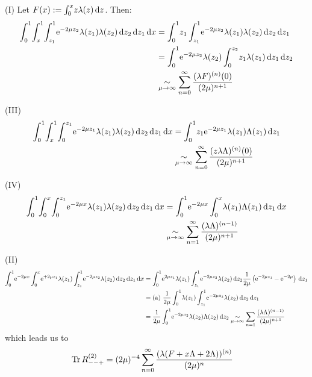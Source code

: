 (I) Let $F(x) := \Integ[x]{0}{z}{z\lambda(z)}$. Then:
\begin{align*}
  \Int{x}{
    \Integ[1]{x}{z_1}{\Integ[1]{z_1}{z_2}{
        \Eto{-2\mu z_2}\lambda(z_1)\lambda(z_2)
      }
    }
  }
  &= \Int{z_1}{z_1 \Integ[1]{z_1}{z_2}{\Eto{-2\mu z_2}\lambda(z_1)\lambda(z_2)}}
  \\
  &= \Int{z_2}{\Eto{-2\mu z_2}\lambda(z_2) \Integ[z_2]{0}{z_1}{z_1\lambda(z_1)}}
  \\
  &\SimMu \Wsum{(\lambda F)^{(n)}}
\end{align*}

(III)
\begin{align*}
  \Int{x}{
    \Integ[1]{x}{z_1}{
      \Integ[z_1]{0}{z_2}{
        \Eto{-2\mu z_1}{\lambda(z_1)\lambda(z_2)}
      }
    }
  }
  &= \Int{z_1}{z_1 \Eto{-2\mu z_1}\lambda(z_1)\Lambda(z_1)} \\
  &\SimMu \Wsum{(z\lambda\Lambda)^{(n)}}
\end{align*}

(IV)
\begin{align*}
  \Int{x}{
    \Integ[x]{0}{z_1}{
      \Integ[z_1]{0}{z_2}{
        \Eto{-2\mu x}\lambda(z_1)\lambda(z_2)
      }
    }
  }
  &= \Int{x}{
    \Eto{-2\mu x} \Integ[x]{0}{z_1}{\lambda(z_1)\Lambda(z_1)}
  } \\
  &\SimMu \sum_{n=1}^\infty \frac{(\lambda\Lambda)^{(n-1)}}{(2\mu)^{n+1}}
\end{align*}

(II)
\begin{align*}
  \Int{x}{
    \Eto{-2\mu x}
    \Integ[x]{0}{z_1}{
      \Eto{+2\mu z_1} \lambda(z_1)
      \Integ[1]{z_1}{z_2}{
        \Eto{-2\mu z_2} \lambda(z_2)
      }
    }
  }
  &= \Int{z_1}{
    \Eto{2\mu z_1}\lambda(z_1)
    \Integ[1]{z_1}{z_2}{
      \Eto{-2\mu z_2}\lambda(z_2)
    }
    \frac{1}{2\mu}\left(\Eto{-2\mu z_1} - \Eto{-2\mu}\right)
  } \\
  &= \text{(a) } \frac{1}{2\mu}
    \Int{z_1}{
      \lambda(z_1)
      \Integ[1]{z_1}{z_2}{
        \Eto{-2\mu z_2}\lambda(z_2)
      }
    } \\
  &= \frac{1}{2\mu} \Int{z_2}{\Eto{-2\mu z_2}\lambda(z_2)\Lambda(z_2)}
    \SimMu \sum_{n=1}\frac{(\lambda \Lambda)^{(n-1)}}{(2\mu)^{n+1}}
\end{align*}
which leads us to
\begin{align*}
  \Tr R_{--+}^{(2)}
  &= (2\mu)^{-4} \sum_{n=0}^{\infty}
  \frac{(\lambda(F + x\Lambda + 2\Lambda))^{(n)}}{(2\mu)^n}
\end{align*}


